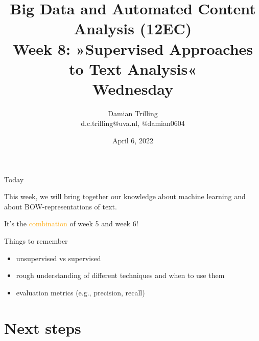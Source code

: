 

\graphicspath{{../../resources/img/}}




\title[Big Data and Automated Content Analysis]{\textbf{Big Data and Automated Content Analysis (12EC)} 
\\Week 8: »Supervised Approaches to Text Analysis«
\\Wednesday}
\author[Damian Trilling]{Damian Trilling\\ \footnotesize{d.c.trilling@uva.nl, @damian0604 \\}}
\date{April 6, 2022}


\begin{frame}{}
	\titlepage
\end{frame}

\begin{frame}{Today}
	\tableofcontents
\end{frame}




\begin{frame}[standout]
This week, we will bring together our knowledge about machine learning and about BOW-representations of text.

It's the \textcolor{orange}{combination} of week 5 and week 6!
\end{frame}










\begin{frame}{Things to remember}
  \begin{itemize}
  \item unsupervised vs supervised
  \item rough understanding of different techniques and when to use them
  \item evaluation metrics (e.g., precision, recall)
\end{itemize}
\end{frame}

\section{Next steps}




